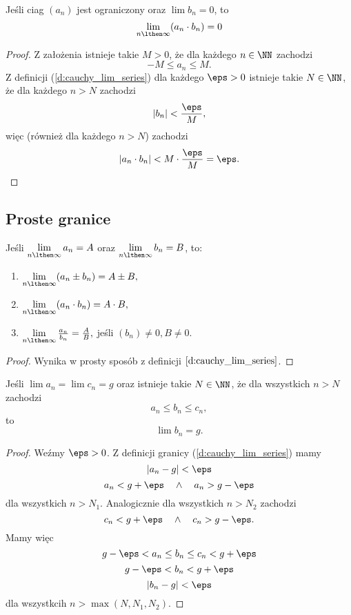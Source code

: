 \documentclass[11pt]{scrartcl}
\begin{document}
    \begin{theorem}
        \label{t:sequence bounded and convergent to 0}
        Jeśli ciag $(a_n)$ jest ograniczony oraz $\lim b_n = 0$, to
        \[ \lim_{n \lthen \infty} (a_n \cdot b_n) = 0 \]
    \end{theorem}
    \begin{proof}
        Z założenia istnieje takie $M > 0$, że dla każdego $n \in \NN$ zachodzi
        \[ -M \leq a_n \leq M. \]
        Z definicji (\ref{d:cauchy_lim_series}) dla każdego $\eps > 0$ istnieje takie $N \in \NN$, że dla każdego $n > N$ zachodzi
        \[ |b_n| < \frac{\eps}{M}, \]
        więc (również dla każdego $n > N$) zachodzi
        \[ |a_n \cdot b_n| < M \cdot \frac{\eps}{M} = \eps. \]
    \end{proof}

    \subsection{Proste granice}
    \begin{theorem}
        Jeśli $\lim\limits_{n \lthen \infty} a_n = A$ oraz $\lim\limits_{n \lthen \infty} b_n = B$, to:
        \begin{enumerate}
            \item $\lim\limits_{n \lthen \infty} (a_n \pm b_n) = A \pm B,$
            \item $\lim\limits_{n \lthen \infty} (a_n \cdot b_n) = A \cdot B,$
            \item $\lim\limits_{n \lthen \infty} \frac{a_n}{b_n} = \frac{A}{B},$ jeśli $(b_n) \neq 0, B \neq 0$.
        \end{enumerate}
    \end{theorem}
    \begin{proof}
        Wynika w prosty sposób z definicji $\ref{d:cauchy_lim_series}$.
    \end{proof}

    \begin{theorem}
        \label{t:sequence squeeze theorem}
        Jeśli $\lim a_n = \lim c_n = g$ oraz istnieje takie $N \in \NN$, że dla wszystkich $n > N$ zachodzi
        \[ a_n \leq b_n \leq c_n, \]
        to
        \[ \lim b_n = g. \]
    \end{theorem}
    \begin{proof}
        Weźmy $\eps > 0$. Z definicji granicy (\ref{d:cauchy_lim_series}) mamy
        \[ |a_n - g| < \eps \]
        \[ a_n < g + \eps \quad\land\quad a_n > g - \eps \]
        dla wszystkich $n > N_1$.
        Analogicznie dla wszystkich $n > N_2$ zachodzi
        \[ c_n < g + \eps \quad\land\quad c_n > g - \eps. \]
        Mamy więc
        \[ g - \eps < a_n \leq b_n \leq c_n < g + \eps \]
        \[ g - \eps < b_n < g + \eps \]
        \[ |b_n - g| < \eps \]
        dla wszystkcih $n > \max(N, N_1, N_2)$.
    \end{proof}
\end{document}
